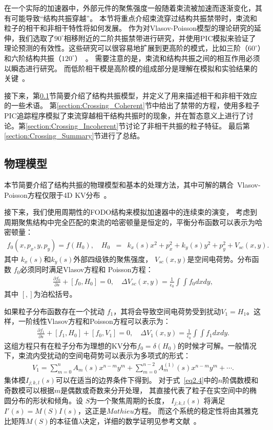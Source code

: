 在一个实际的加速器中，外部元件的聚焦强度一般随着束流被加速而逐渐变化，其有可能导致“结构共振穿越”。
本节将重点介绍束流穿过结构共振禁带时，束流和粒子的相干和非相干特性将如何发展。
作为对Vlasov-Poisson模型的理论研究的延伸，我们选取了$90^{\circ}$相移附近的二阶共振禁带进行研究，并使用PIC模拟来验证了理论预测的有效性。这些研究可以很容易地扩展到更高阶的模式，比如三阶（$60^{\circ}$）和六阶结构共振（$120^{\circ}$）~\cite{36,40}。
需要注意的是，束流和结构共振之间的相互作用必须以瞬态进行研究。
而低阶相干模是高阶模的组成部分是理解在模拟和实验结果的关键~\cite{groening2009experimental,33}。

接下来，第\ref{section:Crossing_model}节简要介绍了结构共振模型，并定义了用来描述相干和非相干效应的一些术语。
第\ref{section:Crossing_Coherent}节中给出了禁带的方程，使用多粒子PIC追踪程序模拟了束流穿越相干结构共振时的现象，并在暂态意义上进行了讨论。第\ref{section:Crossing_Incoherent}节讨论了非相干共振的粒子特征。
最后第\ref{section:Crossing_Summary}节进行了总结。

\subsection{物理模型}
\label{section:Crossing_model}
本节简要介绍了结构共振的物理模型和基本的处理方法，其中可解的耦合~Vlasov-Poisson方程仅限于4D KV分布~\cite{20}。

接下来，我们使用周期性的FODO结构来模拟加速器中的连续束的演变， 考虑到周期聚焦结构中完全匹配的束流的哈密顿量是恒定的，平衡分布函数可以表示为哈密顿量：
\begin{eqnarray}\label{eq2.1}
  f_0(x,p_x,y,p_y) =f(H_0),  \quad  H_0&=&k_x(s)x^2+p_x^2+k_y(s)y^2+p_y^2+V_{sc}(x,y).
\end{eqnarray}
其中 $k_x(s)$和$k_y(s)$外部四级铁的聚焦强度， $V_{sc}(x,y)$是空间电荷势。分布函数 $f_0$必须同时满足Vlasov方程和 Poisson方程：
\begin{eqnarray}\label{eq2.2}
\frac{\partial f_0}{\partial s} + [f_0,H_0]=0,   \quad \Delta V_{sc}(x,y)  = \frac{1}{\epsilon_0}  \int \int f_0 dxdy,
\end{eqnarray}
其中 $[,]$为泊松括号。

如果粒子分布函数存在一个扰动 $f_1$，其将会导致空间电荷势受到扰动$V_1=H_1$。这样，一阶线性Vlasov方程和Poisson方程可以表示为：
\begin{eqnarray}\label{eq2.3}
\frac{\partial f_1}{\partial s} + [f_1,H_0] +  [f_0,V_1]=0,   \quad \Delta V_1(x,y)  = \frac{1}{\epsilon_0}  \int \int f_1 dxdy.
\end{eqnarray}
这组方程只有在粒子分布为理想的KV分布$f_0=\delta(H_0)$的时候才可解。一般情况下，束流内受扰动的空间电荷势可以表示为多项式的形式：
\begin{eqnarray}\label{eq2.4}
V_1=\sum_{m=0}^{n}A_m(s)x^{n-m}y^m +\sum_{m=0}^{n-2}A_m^{(1)}(s)x^{n-m}y^m+\cdots.
\end{eqnarray}
集体模$I_{j;k,l}(s)$可以在适当的边界条件下得到。
对于式~\ref{eq2.4}中的$n$阶偶数模和奇数模可以根据$m$是偶数或奇数来分开处理，
其直接代表了粒子在实空间中的椭圆分布的形状和倾角。设 $S$为一个聚焦周期的长度，
$I_{j;k,l}(s)$ 将满足$I'(s) = M(S)I(s)$，这正是$Mathieu$方程。
而这个系统的稳定性将由其雅克比矩阵$M(S)$的本征值$\lambda$决定，详细的数学证明见参考文献~\cite{11,12,18,19}。

